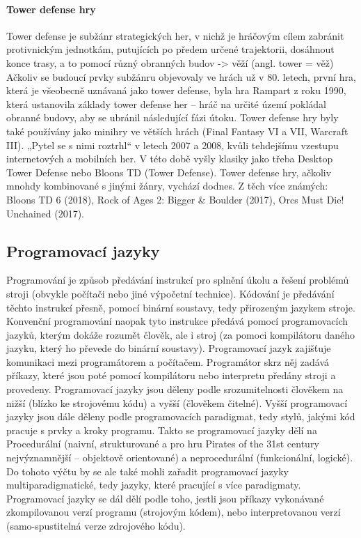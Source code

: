 \documentclass{article}
\begin{document}
\paragraph{Tower defense hry}
Tower defense je subžánr strategických her, v nichž je hráčovým cílem zabránit protivnickým jednotkám, putujících po předem určené trajektorii, dosáhnout konce trasy, a to pomocí různý obranných budov -> věží (angl. tower = věž)
Ačkoliv se budoucí prvky subžánru objevovaly ve hrách už v 80. letech, první hra, která je všeobecně uznávaná jako tower defense, byla hra Rampart z roku 1990, která ustanovila základy tower defense her – hráč na určité území pokládal obranné budovy, aby se ubránil následující fázi útoku. Tower defense hry byly také používány jako minihry ve větších hrách (Final Fantasy VI a VII, Warcraft III). „Pytel se s nimi roztrhl“ v letech 2007 a 2008, kvůli tehdejšímu vzestupu internetových a mobilních her. V této době vyšly klasiky jako třeba Desktop Tower Defense nebo Bloons TD (Tower Defense).
Tower defense hry, ačkoliv mnohdy kombinované s jinými žánry, vychází dodnes. Z těch více známých: Bloons TD 6 (2018), Rock of Ages 2: Bigger \& Boulder (2017), Orcs Must Die! Unchained (2017).
\subsection{Programovací jazyky}
Programování je způsob předávání instrukcí pro splnění úkolu a řešení problémů stroji (obvykle počítači nebo jiné výpočetní technice). Kódování je předávání těchto instrukcí přesně, pomocí binární soustavy, tedy přirozeným jazykem stroje. Konvenční programování naopak tyto instrukce předává pomocí programovacích jazyků, kterým dokáže rozumět člověk, ale i stroj (za pomoci kompilátoru daného jazyku, který ho převede do binární soustavy).
Programovací jazyk zajišťuje komunikaci mezi programátorem a počítačem. Programátor skrz něj zadává příkazy, které jsou poté pomocí kompilátoru nebo interpretu předány stroji a provedeny. 
Programovací jazyky jsou děleny podle srozumitelnosti člověkem na nižší (blízko ke strojovému kódu) a vyšší (člověkem čitelné). 
Vyšší programovací jazyky jsou dále děleny podle programovacích paradigmat, tedy stylů, jakými kód pracuje s prvky a kroky programu. Takto se programovací jazyky dělí na Procedurální (naivní, strukturované a pro hru Pirates of the 31st century nejvýznamnější – objektově orientované) a neprocedurální (funkcionální, logické). Do tohoto výčtu by se ale také mohli zařadit programovací jazyky multiparadigmatické, tedy jazyky, které pracující s více paradigmaty.
Programovací jazyky se dál dělí podle toho, jestli jsou příkazy vykonávané zkompilovanou verzí programu (strojovým kódem), nebo interpretovanou verzí (samo-spustitelná verze zdrojového kódu).
\end{document}

